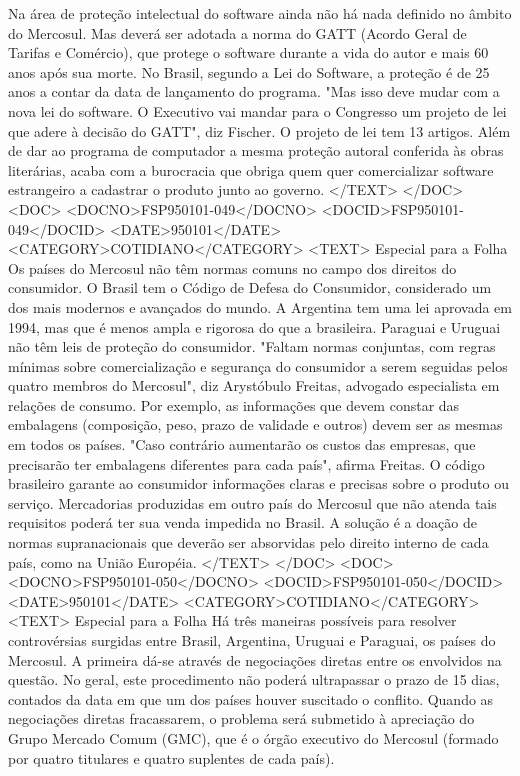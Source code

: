 Na área de proteção intelectual do software ainda não há nada definido no âmbito do Mercosul. Mas deverá ser adotada a norma do GATT (Acordo Geral de Tarifas e Comércio), que protege o software durante a vida do autor e mais 60 anos após sua morte.
No Brasil, segundo a Lei do Software, a proteção é de 25 anos a contar da data de lançamento do programa. "Mas isso deve mudar com a nova lei do software. O Executivo vai mandar para o Congresso um projeto de lei que adere à decisão do GATT", diz Fischer.
O projeto de lei tem 13 artigos. Além de dar ao programa de computador a mesma proteção autoral conferida às obras literárias, acaba com a burocracia que obriga quem quer comercializar software estrangeiro a cadastrar o produto junto ao governo.
</TEXT>
</DOC>
<DOC>
<DOCNO>FSP950101-049</DOCNO>
<DOCID>FSP950101-049</DOCID>
<DATE>950101</DATE>
<CATEGORY>COTIDIANO</CATEGORY>
<TEXT>
Especial para a Folha
Os países do Mercosul não têm normas comuns no campo dos direitos do consumidor. O Brasil tem o Código de Defesa do Consumidor, considerado um dos mais modernos e avançados do mundo. A Argentina tem uma lei aprovada em 1994, mas que é menos ampla e rigorosa do que a brasileira. Paraguai e Uruguai não têm leis de proteção do consumidor.
"Faltam normas conjuntas, com regras mínimas sobre comercialização e segurança do consumidor a serem seguidas pelos quatro membros do Mercosul", diz Arystóbulo Freitas, advogado especialista em relações de consumo.
Por exemplo, as informações que devem constar das embalagens (composição, peso, prazo de validade e outros) devem ser as mesmas em todos os países. "Caso contrário aumentarão os custos das empresas, que precisarão ter embalagens diferentes para cada país", afirma Freitas.
O código brasileiro garante ao consumidor informações claras e precisas sobre o produto ou serviço. Mercadorias produzidas em outro país do Mercosul que não atenda tais requisitos poderá ter sua venda impedida no Brasil.
A solução é a doação de normas supranacionais que deverão ser absorvidas pelo direito interno de cada país, como na União Européia.
</TEXT>
</DOC>
<DOC>
<DOCNO>FSP950101-050</DOCNO>
<DOCID>FSP950101-050</DOCID>
<DATE>950101</DATE>
<CATEGORY>COTIDIANO</CATEGORY>
<TEXT>
Especial para a Folha
Há três maneiras possíveis para resolver controvérsias surgidas entre Brasil, Argentina, Uruguai e Paraguai, os países do Mercosul.
A primeira dá-se através de negociações diretas entre os envolvidos na questão. No geral, este procedimento não poderá ultrapassar o prazo de 15 dias, contados da data em que um dos países houver suscitado o conflito.
Quando as negociações diretas fracassarem, o problema será submetido à apreciação do Grupo Mercado Comum (GMC), que é o órgão executivo do Mercosul (formado por quatro titulares e quatro suplentes de cada país).
